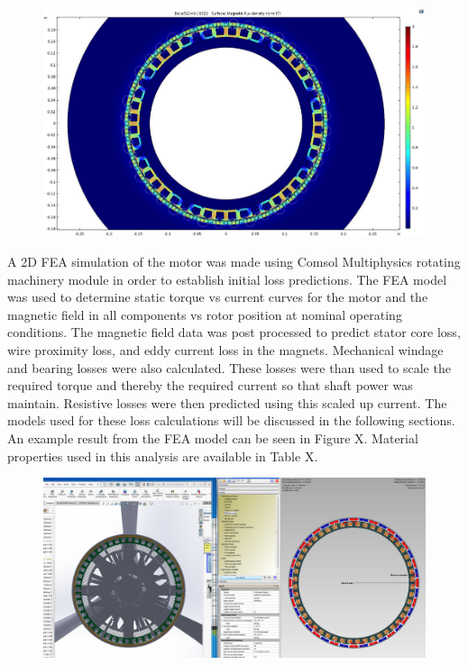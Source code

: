 \documentclass[]{aiaa-tc}%
\begin{document}
\begin{figure}[!htb]%
	\centering
	\includegraphics[width=1.0\textwidth]{figures/COMSOL_EM.png}
	\caption{}
	\label{fig:motorSolve}
\end{figure}


A 2D FEA simulation of the motor was made using Comsol Multiphysics rotating machinery module in order to establish initial loss predictions. The FEA model was used to determine static torque vs current curves for the motor and the magnetic field in all components vs rotor position at nominal operating conditions. The magnetic field data was post processed to predict stator core loss, wire proximity loss, and eddy current loss in the magnets. Mechanical windage and bearing losses were also calculated. These losses were than used to scale the required torque and thereby the required current so that shaft power was maintain. Resistive losses were then predicted using this scaled up current. The models used for these loss calculations will be discussed in the following sections. An example result from the FEA model can be seen in Figure X. Material properties used in this analysis are available in Table X.

\begin{figure}[!htb]%
	\centering
	\includegraphics[width=1.0\textwidth]{figures/motorSolve.png}
	\caption{}
	\label{fig:motorSolve}
\end{figure}
\end{document}
